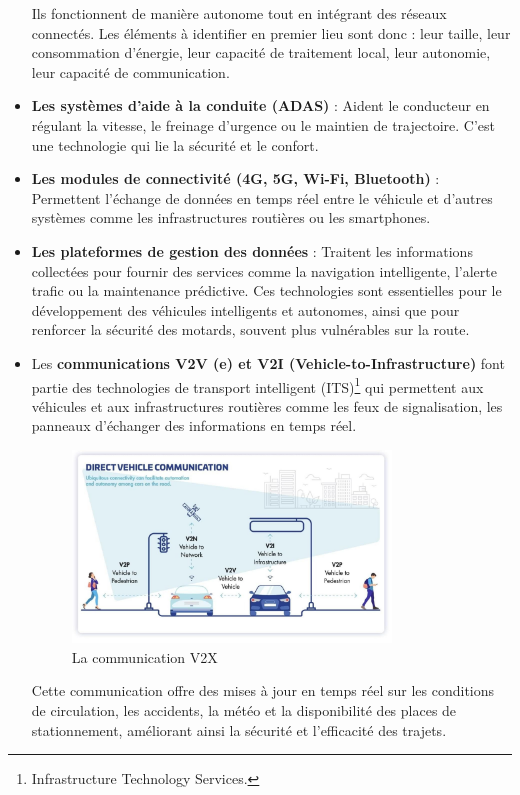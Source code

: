 \begin{itemize}
    Ils fonctionnent de manière autonome tout en intégrant des réseaux connectés. Les éléments à identifier en premier lieu sont donc : leur taille, leur consommation d’énergie, leur capacité de traitement local, leur autonomie, leur capacité de communication.
    \item \textbf{Les systèmes d’aide à la conduite (ADAS)} : Aident le conducteur en régulant la vitesse, le freinage d’urgence ou le maintien de trajectoire. C'est une technologie qui lie la sécurité et le confort.
    \item \textbf{Les modules de connectivité (4G, 5G, Wi-Fi, Bluetooth)} : Permettent l’échange de données en temps réel entre le véhicule et d’autres systèmes comme les infrastructures routières ou les smartphones.
    \item \textbf{Les plateformes de gestion des données} : Traitent les informations collectées pour fournir des services comme la navigation intelligente, l’alerte trafic ou la maintenance prédictive.
Ces technologies sont essentielles pour le développement des véhicules intelligents et autonomes, ainsi que pour renforcer la sécurité des motards, souvent plus vulnérables sur la route.
    \item Les \textbf{communications V2V (e) et V2I (Vehicle-to-Infrastructure)} font partie des technologies de transport intelligent (ITS)\footnote{Infrastructure Technology Services.} qui permettent aux véhicules et aux infrastructures routières comme les feux de signalisation, les panneaux d’échanger des informations en temps réel.

    \begin{figure}[H]
        \centering
        \includegraphics[width=0.8\textwidth]{images/schema_v2.png} 
        \caption{La communication V2X}
    \end{figure}

    Cette communication offre des mises à jour en temps réel sur les conditions de circulation, les accidents, la météo et la disponibilité des places de stationnement, améliorant ainsi la sécurité et l’efficacité des trajets\cite{joberty_blog}.\\

\end{itemize}
\vspace{0.5cm}

